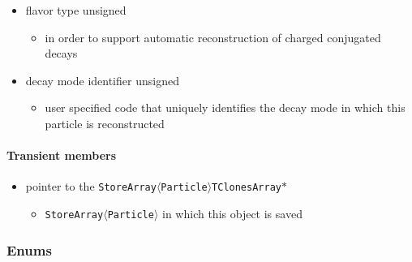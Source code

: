 \begin{itemize}
\begin{itemize}
 \end{itemize}
 \item {\color{blue}flavor type} \hfill{unsigned}
 \begin{itemize}
  \item in order to support automatic reconstruction of charged conjugated decays
 \end{itemize}
 \item {\color{blue}decay mode identifier} \hfill{unsigned}
 \begin{itemize}
  \item user specified code that uniquely identifies the decay mode in which this particle is reconstructed
 \end{itemize}
\end{itemize}

\paragraph{Transient members}

\begin{itemize}
 \item {\color{blue} pointer to the {\tt StoreArray$\langle$Particle$\rangle$}}\hfill{\tt TClonesArray$\ast$}
 \begin{itemize}
  \item  {\tt StoreArray$\langle$Particle$\rangle$} in which this \particle object is saved
 \end{itemize}
\end{itemize}

\subsubsection{Enums}

